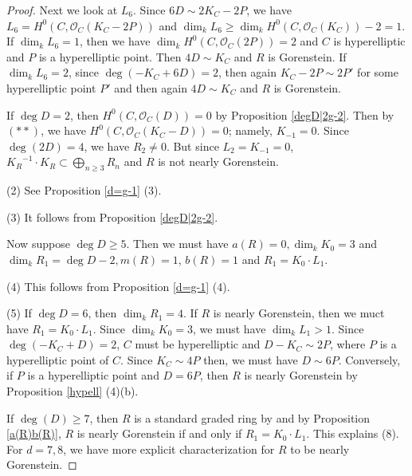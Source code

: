 \documentclass[12pt]{amsart}
\theoremstyle{definition}
\theoremstyle{remark}
\numberwithin{equation}{section}
\newcommand{\KiR}{{K_R}^{-1}}
\newcommand{\cO}{\mathcal O}
\renewcommand{\:}{\colon}
\begin{document}
\begin{proof}
\par
Next we look at $L_6$. 
Since $6D \sim 2K_C - 2P$, 
we have $L_6 = H^0(C,\cO_C(K_C - 2P))$ and 
$\dim_k L_6 \ge \dim_k H^0(C,\cO_C(K_C)) -2 =1$.  
If $\dim_k L_6 = 1$, then we have $\dim_k H^0(C,\cO_C(2P)) =2$ and $C$ is hyperelliptic and 
$P$ is a hyperelliptic point. 
Then $4D\sim K_C$ and $R$ is Gorenstein. 
If $\dim_k L_6=2$, 
since $\deg (-K_C+6D) = 2$, 
then again $K_C- 2P\sim 2P'$ for some hyperelliptic point $P'$ and 
then again $4D\sim K_C$ and $R$ is Gorenstein. 


\par \vspace{1mm}
If $\deg D=2$, then $H^0(C,\cO_C(D))=0$ by Proposition 
\ref{degD|2g-2}. 
Then by $(**)$, we have $H^0(C, \cO_C(K_C -D))=0$; namely, $K_{-1} =0$. 
Since $\deg (2D) =4$, we have $R_2 \ne 0$. But since $L_2=K_{-1}=0$, 
$\KiR\cdot K_R \subset \bigoplus_{n\ge 3}R_n$ and $R$ is not nearly Gorenstein. 
\par \vspace{1mm}
(2) See Proposition \ref{d=g-1} (3). 
 
\par \vspace{1mm}
(3) It follows from Proposition \ref{degD|2g-2}. 

\par \vspace{2mm}
 Now suppose $\deg D \ge 5$. 
Then we must have $a(R)=0, \dim_k K_0=3$ and 
$\dim_k R_1 = \deg D -2,  
m(R)=1$, $b(R)=1$ and $R_1= K_0\cdot L_1$. 


\par \vspace{1mm}
(4) This follows from Proposition \ref{d=g-1} (4). 

\par \vspace{1mm}
(5) If $\deg D =6$, then $\dim_k R_1 = 4$. 
 If $R$ is nearly Gorenstein, then  
we muct have $R_1 = K_0\cdot L_1$.  Since $\dim_k K_0=3$, 
we must have $\dim_k L_1>1$. 
Since $\deg (- K_C +D) =2$, $C$ must be hyperelliptic and 
$D-K_C \sim 2P$, where $P$ is a hyperelliptic point of $C$. Since $K_C \sim 4P$ then, 
we must have $D\sim 6P$. Conversely, if $P$ is a hyperelliptic point and $D=6P$, 
then $R$ is nearly Gorenstein by Proposition \ref{hypell} (4)(b).
\par
\vspace{1mm}
If $\deg(D) \ge 7$,
then $R$ is a standard graded ring by \cite{Mum} and 
by Proposition \ref{a(R)b(R)},   
$R$ is nearly Gorenstein if and only if $R_1 = K_0\cdot L_1$.
This explains (8). For $d=7, 8$, we have more explicit characterization 
for $R$ to be nearly Gorenstein.  


\end{proof}
\end{document}
